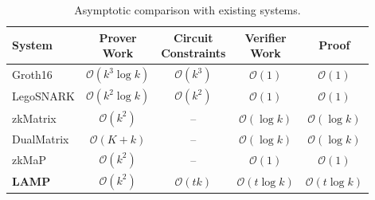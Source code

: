 \begin{table}[t]
\centering
\footnotesize
  \ifshowrevisions
  \fi
\setlength{\tabcolsep}{2pt}
\renewcommand{\arraystretch}{1.08}
\begin{tabular*}{\columnwidth}{@{\extracolsep{\fill}}lcccc@{}}
\toprule
\textbf{System} &
\shortstack{\textbf{Prover}\\\textbf{Work}} &
\shortstack{\textbf{Circuit}\\\textbf{Constraints}} &
\shortstack{\textbf{Verifier}\\\textbf{Work}} &
\textbf{Proof} \\
\midrule
Groth16
& $\mathcal{O}(k^3 \log k)$
& $\mathcal{O}(k^3)$
& $\mathcal{O}(1)$
& $\mathcal{O}(1)$ \\
    LegoSNARK
    & $\mathcal{O}(k^2 \log k)$
    & $\mathcal{O}(k^2)$
    & $\mathcal{O}(1)$
    & $\mathcal{O}(1)$ \\

    zkMatrix
    & $\mathcal{O}(k^2)$
    & -- 
    & $\mathcal{O}(\log k)$
    & $\mathcal{O}(\log k)$ \\

    DualMatrix
    & $\mathcal{O}(K+k)$
    & --
    & $\mathcal{O}(\log k)$
    & $\mathcal{O}(\log k)$ \\

    zkMaP
    & $\mathcal{O}(k^2)$
    & --
    & $\mathcal{O}(1)$
    & $\mathcal{O}(1)$ \\

    \textbf{LAMP}
    & $\mathcal{O}(k^2)$
    & $\mathcal{O}(tk)$
    & $\mathcal{O}(t\log k)$
    & $\mathcal{O}(t\log k)$ \\
    \bottomrule
\end{tabular*}
\vspace{4pt}
\caption{Asymptotic comparison with existing systems.}
\label{tab:asymptotic_comparison}
\end{table}
